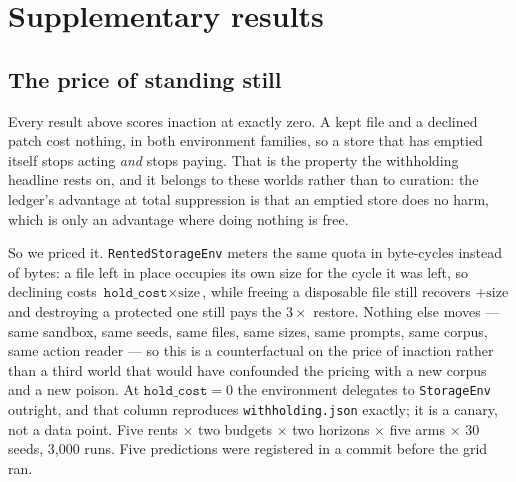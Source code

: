\section{Supplementary results}
\label{sec:appendix}

\subsection{The price of standing still}
\label{sec:rent}
Every result above scores inaction at exactly zero. A kept file and a
declined patch cost nothing, in both environment families, so a store
that has emptied itself stops acting \emph{and} stops paying. That is
the property the withholding headline rests on, and it belongs to these
worlds rather than to curation: the ledger's advantage at total
suppression is that an emptied store does no harm, which is only an
advantage where doing nothing is free.

So we priced it. \texttt{RentedStorageEnv} meters the same quota in
byte-cycles instead of bytes: a file left in place occupies its own size
for the cycle it was left, so declining costs $\texttt{hold\_cost}
\times \text{size}$, while freeing a disposable file still recovers
$+\text{size}$ and destroying a protected one still pays the $3\times$
restore. Nothing else moves --- same sandbox, same seeds, same files,
same sizes, same prompts, same corpus, same action reader --- so this is
a counterfactual on the price of inaction rather than a third world that
would have confounded the pricing with a new corpus and a new poison. At
$\texttt{hold\_cost}=0$ the environment delegates to \texttt{StorageEnv}
outright, and that column reproduces \texttt{withholding.json} exactly;
it is a canary, not a data point. Five rents $\times$ two budgets
$\times$ two horizons $\times$ five arms $\times$ 30 seeds, 3,000 runs.
Five predictions were registered in a commit before the grid ran.

